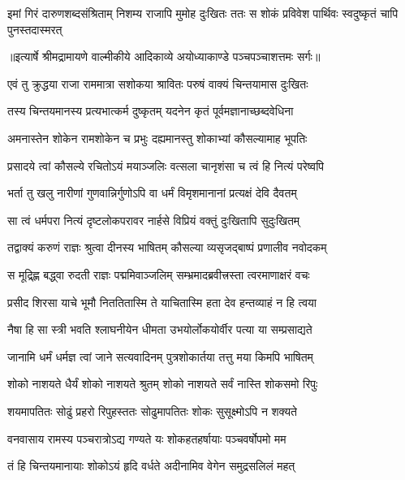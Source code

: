 \fourlineindentedshloka
{इमां गिरं दारुणशब्दसंश्रिताम्}
{निशम्य राजापि मुमोह दुःखितः}
{ततः स शोकं प्रविवेश पार्थिवः}
{स्वदुष्कृतं चापि पुनस्तदास्मरत्} %


{॥इत्यार्षे श्रीमद्रामायणे वाल्मीकीये आदिकाव्ये अयोध्याकाण्डे पञ्चपञ्चाशत्तमः सर्गः॥}


\twolineshloka
{एवं तु क्रुद्धया राजा राममात्रा सशोकया}
{श्रावितः परुषं वाक्यं चिन्तयामास दुःखितः} %

\twolineshloka
{तस्य चिन्तयमानस्य प्रत्यभात्कर्म दुष्कृतम्}
{यदनेन कृतं पूर्वमज्ञानाच्छब्दवेधिना} %

\twolineshloka
{अमनास्तेन शोकेन रामशोकेन च प्रभुः}
{दह्यमानस्तु शोकाभ्यां कौसल्यामाह भूपतिः} %

\twolineshloka
{प्रसादये त्वां कौसल्ये रचितोऽयं मयाञ्जलिः}
{वत्सला चानृशंसा च त्वं हि नित्यं परेष्वपि} %

\twolineshloka
{भर्ता तु खलु नारीणां गुणवान्निर्गुणोऽपि वा}
{धर्मं विमृशमानानां प्रत्यक्षं देवि दैवतम्} %

\twolineshloka
{सा त्वं धर्मपरा नित्यं दृष्टलोकपरावर}
{नार्हसे विप्रियं वक्तुं दुःखितापि सुदुःखितम्} %

\twolineshloka
{तद्वाक्यं करुणं राज्ञः श्रुत्वा दीनस्य भाषितम्}
{कौसल्या व्यसृजद्बाष्पं प्रणालीव नवोदकम्} %

\twolineshloka
{स मूद्र्ह्णि बद्ध्वा रुदती राज्ञः पद्ममिवाञ्जलिम्}
{सम्भ्रमादब्रवीत्त्रस्ता त्वरमाणाक्षरं वचः} %

\twolineshloka
{प्रसीद शिरसा याचे भूमौ निततितास्मि ते}
{याचितास्मि हता देव हन्तव्याहं न हि त्वया} %

\twolineshloka
{नैषा हि सा स्त्री भवति श्लाघनीयेन धीमता}
{उभयोर्लोकयोर्वीर पत्या या सम्प्रसाद्यते} %

\twolineshloka
{जानामि धर्मं धर्मज्ञ त्वां जाने सत्यवादिनम्}
{पुत्रशोकार्तया तत्तु मया किमपि भाषितम्} %

\twolineshloka
{शोको नाशयते धैर्यं शोको नाशयते श्रुतम्}
{शोको नाशयते सर्वं नास्ति शोकसमो रिपुः} %

\twolineshloka
{शयमापतितः सोढुं प्रहरो रिपुहस्ततः}
{सोढुमापतितः शोकः सुसूक्ष्मोऽपि न शक्यते} %

\twolineshloka
{वनवासाय रामस्य पञ्चरात्रोऽद्य गण्यते}
{यः शोकहतहर्षायाः पञ्चवर्षोपमो मम} %

\twolineshloka
{तं हि चिन्तयमानायाः शोकोऽयं हृदि वर्धते}
{अदीनामिव वेगेन समुद्रसलिलं महत्} %

